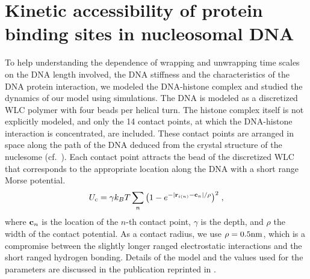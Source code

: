 \section{Kinetic accessibility of protein binding sites in nucleosomal DNA}
To help understanding the dependence of wrapping and unwrapping time scales on the DNA length involved, the DNA stiffness
and the characteristics of the DNA protein interaction, we modeled the DNA-histone complex and studied
the dynamics of our model using simulations. The DNA is modeled as a discretized WLC polymer
with four beads per helical turn. The histone complex itself is not explicitly modeled, and only the 14 
contact points, at which the DNA-histone interaction is concentrated, are included. These contact points
are arranged in space along the path of the DNA deduced from the crystal structure of the nuclesome
(cf.~). Each contact point attracts the bead of the discretized WLC that corresponds to the 
appropriate location along the DNA with a short range Morse potential.
\begin{equation}
\label{eq:nuc_contact_potential}
  U_{\rm c} = \gamma k_BT \sum_{n}\big(1-e^{-|{\bf r}_{i(n)}-{\bf c}_n|/\rho}\big)^2 \;,
\end{equation}
where ${\bf c}_n$ is the location of the $n$-th contact point, $\gamma$ is the depth, and $\rho$ 
the width of the contact potential. As a contact radius, we use $\rho=0.5\mathrm{nm}$, which 
is a compromise between the slightly longer ranged electrostatic interactions and the short ranged
hydrogen bonding. 
Details of the model and the values used for the parameters are discussed in
the publication reprinted in  \cite{Moebius_PRL_06}. 


